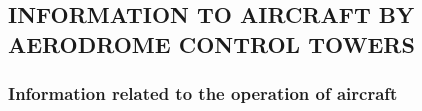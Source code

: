 \documentclass[../vATM.tex]{subfiles}
\begin{document}

    \subsection[Information to aircraft by aerodrome control towers]{INFORMATION TO AIRCRAFT BY AERODROME CONTROL TOWERS}

    \subsubsection{Information related to the operation of aircraft}

    \begin{enumempty}[labelindent=\parindent]
        \item {}
    \end{enumempty}
\end{document}
